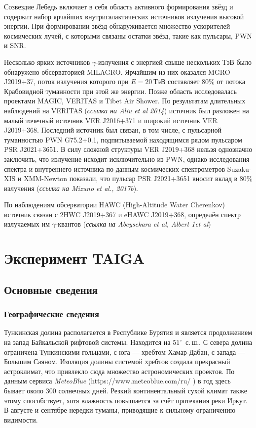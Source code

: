 \documentclass[magd,floatypics,numeref]{msudipl} %
\begin{document}
Созвездие Лебедь включает в себя область активного формирования звёзд и содержит набор ярчайших внутригалактических источников излучения высокой энергии. При формировании звёзд обнаруживается множество ускорителей космических лучей, с которыми связаны остатки звёзд, такие как пульсары, PWN и SNR. 

Несколько ярких источников $\gamma$-излучения с энергией свыше нескольких ТэВ было обнаружено обсерваторией MILAGRO. Ярчайшим из них оказался MGRO J2019+37, поток излучения которого при $E=20~\text{ТэВ}$ составляет 80\% от потока Крабовидной туманности при этой же энергии. Позже область исследовалась проектами MAGIC, VERITAS и Tibet Air Shower. По результатам длительных  наблюдений на VERITAS (\textit{ссылка на Aliu et al 2014}) источник был разложен на малый точечный источник VER J2016+371 и широкий источник VER J2019+368. Последний источник был связан, в том числе, с пульсарной туманностью PWN G75.2+0.1, подпитываемой находящимся рядом пульсаром PSR J2021+3651. В силу сложной структуры VER J2019+368 нельзя однозначно заключить, что излучение исходит исключительно из PWN, однако исследования спектра и внутреннего источника  по данным космических спектрометров Suzaku-XIS и XMM-Newton показали, что пульсар PSR J2021+3651 вносит вклад в 80\% излучения (\textit{ссылка на Mizuno et al., 2017b}). 

По наблюдениям обсерватории HAWC (High-Altitude Water Cherenkov) источник связан с 2HWC J2019+367 и eHAWC J2019+368, определён спектр излучаемых им $\gamma$-квантов (\textit{ссылка на Abeysekara et al, Albert 1et al})
\chapter{Эксперимент TAIGA}
\section{Основные сведения}
\subsection{Географические сведения}
Тункинская долина располагается в Республике Бурятия и является продолжением на запад Байкальской рифтовой системы.  Находится на $51^{\circ}$~с.\,ш.. С севера долина ограничена Тункинскими гольцами, с юга --- хребтом Хамар-Дабан, с запада --- Большим Саяном. Изоляция долины системой хребтов создала прекрасный астроклимат, что привлекло сюда множество астрономических проектов. По данным сервиса \textit{MeteoBlue} (https://www.meteoblue.com/ru/%
)
в год здесь бывает около 300 солнечных дней. Резкий континентальный сухой климат также этому способствует, хотя влажность повышается за счёт протекания реки Иркут. В августе и сентябре нередки туманы, приводящие к сильному ограничению видимости. 
\end{document}
